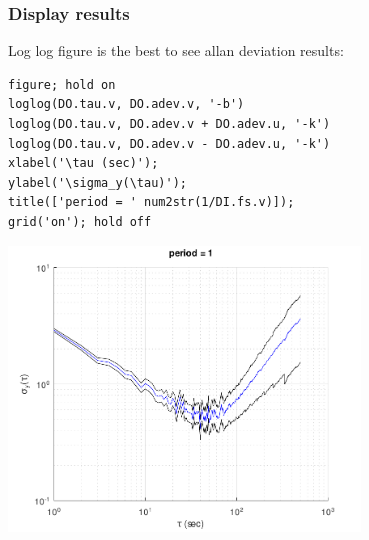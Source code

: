 {}
\subsubsection*{Display results}



Log log figure is the best to see allan deviation results:

\begin{lstlisting}
figure; hold on
loglog(DO.tau.v, DO.adev.v, '-b')
loglog(DO.tau.v, DO.adev.v + DO.adev.u, '-k')
loglog(DO.tau.v, DO.adev.v - DO.adev.u, '-k')
xlabel('\tau (sec)');
ylabel('\sigma_y(\tau)');
title(['period = ' num2str(1/DI.fs.v)]);
grid('on'); hold off
\end{lstlisting}
\begin{center}
\includegraphics[width=0.7\textwidth]{algs_examples_published/FFOAV_alg_example-1.pdf}
\end{center}


\stopcontents[localtoc]
